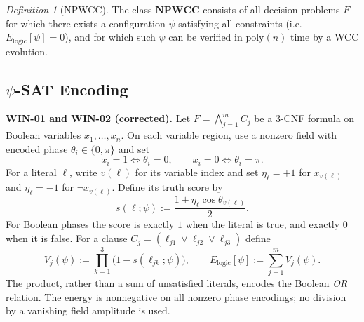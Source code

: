 \documentclass[12pt]{article}
\theoremstyle{remark}
\newtheorem{definition}[theorem]{Definition}
\begin{document}
\begin{definition}[NPWCC]
The class $\mathbf{NPWCC}$ consists of all decision problems $F$ for
which there exists a configuration $\psi$ satisfying all constraints
(i.e.\ $E_{\mathrm{logic}}[\psi]=0$), and for which such $\psi$ can be
verified in $\mathrm{poly}(n)$ time by a WCC evolution.
\end{definition}

\subsection{$\psi$-SAT Encoding}
\label{sec:psi-sat-corrected}
\noindent\textbf{WIN-01 and WIN-02 (corrected).}
Let $F=\bigwedge_{j=1}^m C_j$ be a $3$-CNF formula on Boolean
variables $x_1,\ldots,x_n$. On each variable region, use a nonzero
field with encoded phase $\theta_i\in\{0,\pi\}$ and set
\[
x_i=1\iff\theta_i=0,\qquad x_i=0\iff\theta_i=\pi.
\]
For a literal $\ell$, write $v(\ell)$ for its variable index and set
$\eta_\ell=+1$ for $x_{v(\ell)}$ and $\eta_\ell=-1$ for
$\neg x_{v(\ell)}$. Define its truth score by
\[
 s(\ell;\psi):=\frac{1+\eta_\ell\cos\theta_{v(\ell)}}{2}.
\]
For Boolean phases the score is exactly $1$ when the literal is true,
and exactly $0$ when it is false. For a clause
$C_j=(\ell_{j1}\lor\ell_{j2}\lor\ell_{j3})$ define
\[
 V_j(\psi):=\prod_{k=1}^3\bigl(1-s(\ell_{jk};\psi)\bigr),
 \qquad E_{\mathrm{logic}}[\psi]:=\sum_{j=1}^m V_j(\psi).
\]
The product, rather than a sum of unsatisfied literals, encodes the
Boolean \emph{OR} relation. The energy is nonnegative on all nonzero
phase encodings; no division by a vanishing field amplitude is used.
\end{document}
